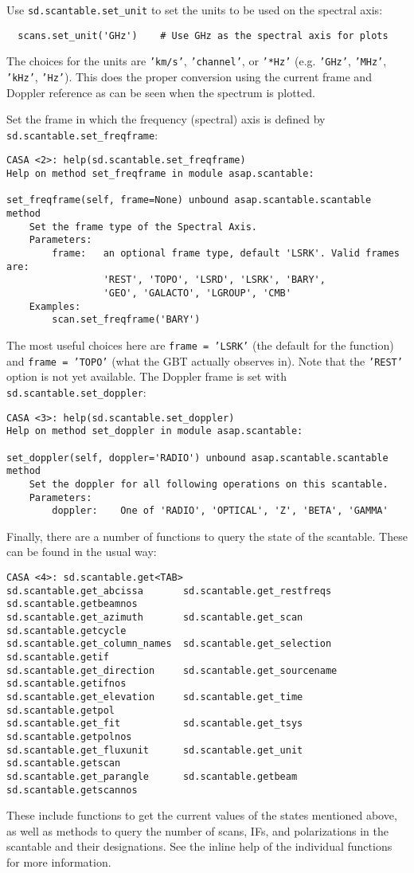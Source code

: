 Use {\tt sd.scantable.set\_unit} to set the units to be used on 
the spectral axis:
\small
\begin{verbatim}
  scans.set_unit('GHz')    # Use GHz as the spectral axis for plots
\end{verbatim}
\normalsize
The choices for the units are {\tt 'km/s'}, {\tt 'channel'}, or
{\tt '*Hz'} (e.g. {\tt 'GHz'}, {\tt 'MHz'}, {\tt 'kHz'}, {\tt 'Hz'}).
This does the proper conversion using the current frame and Doppler
reference as can be seen when the spectrum is plotted.

Set the frame in which the frequency (spectral) axis is defined by {\tt sd.scantable.set\_freqframe}:
\small
\begin{verbatim}
CASA <2>: help(sd.scantable.set_freqframe)
Help on method set_freqframe in module asap.scantable:

set_freqframe(self, frame=None) unbound asap.scantable.scantable method
    Set the frame type of the Spectral Axis.
    Parameters:
        frame:   an optional frame type, default 'LSRK'. Valid frames are:
                 'REST', 'TOPO', 'LSRD', 'LSRK', 'BARY',
                 'GEO', 'GALACTO', 'LGROUP', 'CMB'
    Examples:
        scan.set_freqframe('BARY')
\end{verbatim}
\normalsize
The most useful choices here are {\tt frame = 'LSRK'} (the default for
the function) and {\tt frame = 'TOPO'} (what the GBT actually observes
in).  Note that the {\tt 'REST'} option is not yet available.
The Doppler frame is set with {\tt sd.scantable.set\_doppler}:
\small
\begin{verbatim}
CASA <3>: help(sd.scantable.set_doppler)
Help on method set_doppler in module asap.scantable:

set_doppler(self, doppler='RADIO') unbound asap.scantable.scantable method
    Set the doppler for all following operations on this scantable.
    Parameters:
        doppler:    One of 'RADIO', 'OPTICAL', 'Z', 'BETA', 'GAMMA'
\end{verbatim}
\normalsize

Finally, there are a number of functions to query the state of the
scantable.  These can be found in the usual way:
\small
\begin{verbatim}
CASA <4>: sd.scantable.get<TAB>
sd.scantable.get_abcissa       sd.scantable.get_restfreqs     sd.scantable.getbeamnos
sd.scantable.get_azimuth       sd.scantable.get_scan          sd.scantable.getcycle
sd.scantable.get_column_names  sd.scantable.get_selection     sd.scantable.getif
sd.scantable.get_direction     sd.scantable.get_sourcename    sd.scantable.getifnos
sd.scantable.get_elevation     sd.scantable.get_time          sd.scantable.getpol
sd.scantable.get_fit           sd.scantable.get_tsys          sd.scantable.getpolnos
sd.scantable.get_fluxunit      sd.scantable.get_unit          sd.scantable.getscan
sd.scantable.get_parangle      sd.scantable.getbeam           sd.scantable.getscannos
\end{verbatim}
\normalsize
These include functions to get the current values of the states
mentioned above, as well as
methods to query the number of scans, IFs, and polarizations
in the scantable and their designations.  See the
inline help of the individual functions for more information.

